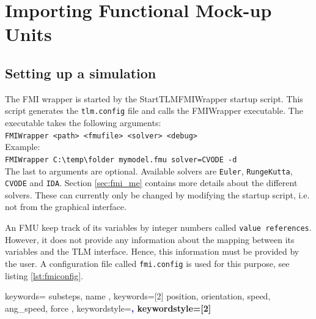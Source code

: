 \chapter{Importing Functional Mock-up Units}
\label{MMFMI}

\section{Setting up a simulation}
\label{sec:setting_up}
The FMI wrapper is started by the StartTLMFMIWrapper startup script.
This script generates the \texttt{tlm.config} file and calls the FMIWrapper executable.
The executable takes the following arguments:\\

\noindent \verb|FMIWrapper <path> <fmufile> <solver> <debug>|\\

Example:\\

\noindent \verb|FMIWrapper C:\temp\folder mymodel.fmu solver=CVODE -d|\\

The last to arguments are optional.
Available solvers are \texttt{Euler}, \texttt{RungeKutta}, \texttt{CVODE} and \texttt{IDA}.
Section \ref{sec:fmi_me} contains more details about the different solvers.
These can currently only be changed by modifying the startup script, i.e. not from the graphical interface.

An FMU keep track of its variables by integer numbers called \texttt{value references}.
However, it does not provide any information about the mapping between its variables and the TLM interface.
Hence, this information must be provided by the user.
A configuration file called \texttt{fmi.config} is used for this purpose, see listing \ref{lst:fmiconfig}.

{
  keywords={
    substeps,
    name
  },
  keywords=[2]{
    position,
    orientation,
    speed,
    ang_speed,
    force
  },
  keywordstyle=\ttfamily\bfseries\textcolor{blue},
  keywordstyle=[2]\ttfamily\bfseries
}

